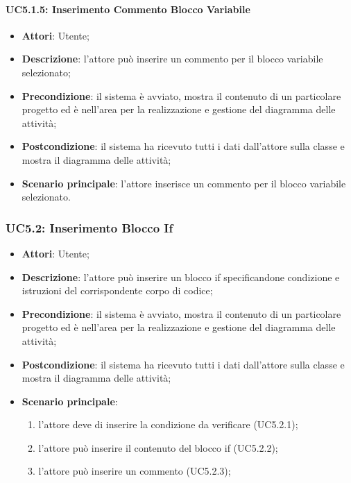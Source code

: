 \paragraph{UC5.1.5: Inserimento Commento Blocco Variabile}
\label{UC5.1.5}
\begin{itemize}
	\item \textbf{Attori}: Utente;
	\item \textbf{Descrizione}: l'attore può inserire un commento per il blocco variabile selezionato;
	\item \textbf{Precondizione}: il sistema è avviato, mostra il contenuto di un particolare progetto ed è nell'area per la realizzazione e gestione del diagramma delle attività;
	\item \textbf{Postcondizione}: il sistema ha ricevuto tutti i dati dall'attore sulla classe e mostra il diagramma delle attività;
	\item \textbf{Scenario principale}: l'attore inserisce un commento per il blocco variabile selezionato.
\end{itemize}

\subsubsection{UC5.2: Inserimento Blocco If}
\label{UC5.2}
\begin{itemize}
	\item \textbf{Attori}: Utente;
	\item \textbf{Descrizione}: l'attore può inserire un blocco if specificandone condizione e istruzioni del corrispondente corpo di codice;
	\item \textbf{Precondizione}: il sistema è avviato, mostra il contenuto di un particolare progetto ed è nell'area per la realizzazione e gestione del diagramma delle attività;
	\item \textbf{Postcondizione}: il sistema ha ricevuto tutti i dati dall'attore sulla classe e mostra il diagramma delle attività;
	\item \textbf{Scenario principale}:
	\begin{enumerate}
		\item l'attore deve di inserire la condizione da verificare (UC5.2.1);
		\item l'attore può inserire il contenuto del blocco if (UC5.2.2);
		\item l'attore può inserire un commento (UC5.2.3);
	\end{enumerate}
\end{itemize}


